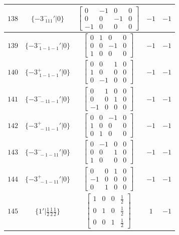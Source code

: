 \documentclass[fleqn,8pt]{jsarticle}
\begin{document}
\begin{longtable}{ccccc}
$ 138 $ & $ \{-3^{-}_{\,\,111}{}'|0\} $ & $ \begin{bmatrix} 0 & -1 & 0 & 0 \\ 0 & 0 & -1 & 0 \\ -1 & 0 & 0 & 0 \end{bmatrix} $ & $ -1 $ & $ -1 $ \\ \hline
$ 139 $ & $ \{-3^{-}_{\,\,1-1-1}{}'|0\} $ & $ \begin{bmatrix} 0 & 1 & 0 & 0 \\ 0 & 0 & -1 & 0 \\ 1 & 0 & 0 & 0 \end{bmatrix} $ & $ -1 $ & $ -1 $ \\ \hline
$ 140 $ & $ \{-3^{+}_{\,\,1-1-1}{}'|0\} $ & $ \begin{bmatrix} 0 & 0 & 1 & 0 \\ 1 & 0 & 0 & 0 \\ 0 & -1 & 0 & 0 \end{bmatrix} $ & $ -1 $ & $ -1 $ \\ \hline
$ 141 $ & $ \{-3^{-}_{\,\,-11-1}{}'|0\} $ & $ \begin{bmatrix} 0 & 1 & 0 & 0 \\ 0 & 0 & 1 & 0 \\ -1 & 0 & 0 & 0 \end{bmatrix} $ & $ -1 $ & $ -1 $ \\ \hline
$ 142 $ & $ \{-3^{+}_{\,\,-11-1}{}'|0\} $ & $ \begin{bmatrix} 0 & 0 & -1 & 0 \\ 1 & 0 & 0 & 0 \\ 0 & 1 & 0 & 0 \end{bmatrix} $ & $ -1 $ & $ -1 $ \\ \hline
$ 143 $ & $ \{-3^{-}_{\,\,-1-11}{}'|0\} $ & $ \begin{bmatrix} 0 & -1 & 0 & 0 \\ 0 & 0 & 1 & 0 \\ 1 & 0 & 0 & 0 \end{bmatrix} $ & $ -1 $ & $ -1 $ \\ \hline
$ 144 $ & $ \{-3^{+}_{\,\,-1-11}{}'|0\} $ & $ \begin{bmatrix} 0 & 0 & 1 & 0 \\ -1 & 0 & 0 & 0 \\ 0 & 1 & 0 & 0 \end{bmatrix} $ & $ -1 $ & $ -1 $ \\ \hline
$ 145 $ & $ \{1{}'|\frac{1}{2} \frac{1}{2} \frac{1}{2}\} $ & $ \begin{bmatrix} 1 & 0 & 0 & \frac{1}{2} \\ 0 & 1 & 0 & \frac{1}{2} \\ 0 & 0 & 1 & \frac{1}{2} \end{bmatrix} $ & $ 1 $ & $ -1 $ \\ \hline

\end{longtable}
\end{document}
